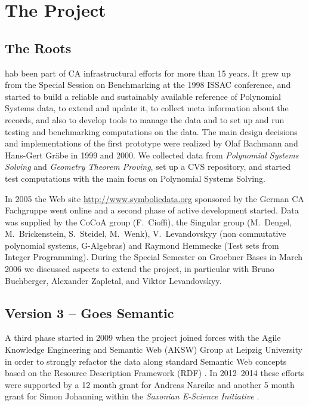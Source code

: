 \documentclass[11pt]{article}
\begin{document}
\section{The {\SD} Project}
\subsection{The Roots}

{\SD} hab been part of CA infrastructural efforts for more than 15 years.  It
grew up from the Special Session on Benchmarking at the 1998 ISSAC conference,
and started to build a reliable and sustainably available reference of
Polynomial Systems data, to extend and update it, to collect meta information
about the records, and also to develop tools to manage the data and to set up
and run testing and benchmarking computations on the data. The main design
decisions and implementations of the first prototype were realized by Olaf
Bachmann and Hans-Gert Gr\"abe in 1999 and 2000. We collected data from
\emph{Polynomial Systems Solving} and \emph{Geometry Theorem Proving}, set up a
CVS repository, and started test computations with the main focus on Polynomial
Systems Solving.

In 2005 the Web site \url{http://www.symbolicdata.org} sponsored by the German
CA Fachgruppe went online and a second phase of active development started.
Data was supplied by the CoCoA group (F.~Cioffi), the Singular group
(M.~Dengel, M.~Brickenstein, S.~Steidel, M.~Wenk), V.~Levandovskyy (non
commutative polynomial systems, G-Algebras) and Raymond Hemmecke (Test sets
from Integer Programming). During the Special Semester on Groebner Bases in
March 2006 we discussed aspects to extend the project, in particular with Bruno
Buchberger, Alexander Zapletal, and Viktor Levandovskyy.

\subsection{Version 3 -- {\SD} Goes Semantic}

A third phase started in 2009 when the project joined forces with the Agile
Knowledge Engineering and Semantic Web (AKSW) Group at Leipzig University
\cite{AKSW} in order to strongly refactor the data along standard Semantic Web
concepts based on the Resource Description Framework (RDF) \cite{RDF}.  In
2012--2014 these efforts were supported by a 12 month grant for Andreas Nareike
and another 5 month grant for Simon Johanning within the \emph{Saxonian
  E-Science Initiative} \cite{E-Science-Sachsen}.
\end{document}
